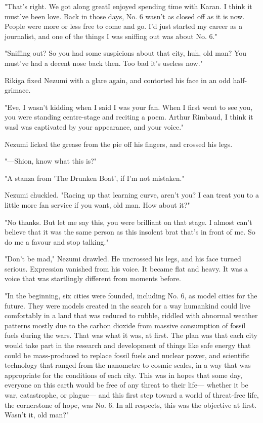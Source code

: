"That's right. We got along great\el I enjoyed spending time with Karan.
I think it must've been love. Back in those days, No. 6 wasn't as closed
off as it is now. People were more or less free to come and go. I'd just
started my career as a journalist, and one of the things I was sniffing
out was about No. 6."

"Sniffing out? So you had some suspicions about that city, huh, old man?
You must've had a decent nose back then. Too bad it's useless now."

Rikiga fixed Nezumi with a glare again, and contorted his face in an odd
half-grimace.

"Eve, I wasn't kidding when I said I was your fan. When I first went to
see you, you were standing centre-stage and reciting a poem. Arthur
Rimbaud, I think it was\el I was captivated by your appearance, and your
voice."

Nezumi licked the grease from the pie off his fingers, and crossed his
legs.


"---Shion, know what this is?"

"A stanza from 'The Drunken Boat', if I'm not mistaken."

Nezumi chuckled. "Racing up that learning curve, aren't you? I can treat
you to a little more fan service if you want, old man. How about it?"

"No thanks. But let me say this, you were brilliant on that stage. I
almost can't believe that it was the same person as this insolent brat
that's in front of me. So do me a favour and stop talking."

"Don't be mad," Nezumi drawled. He uncrossed his legs, and his face
turned serious. Expression vanished from his voice. It became flat and
heavy. It was a voice that was startlingly different from moments
before.

"In the beginning, six cities were founded, including No. 6, as model
cities for the future. They were models created in the search for a way
humankind could live comfortably in a land that was reduced to rubble,
riddled with abnormal weather patterns mostly due to the carbon dioxide
from massive consumption of fossil fuels during the wars. That was what
it was, at first. The plan was that each city would take part in the
research and development of things like safe energy that could be
mass-produced to replace fossil fuels and nuclear power, and scientific
technology that ranged from the nanometre to cosmic scales, in a way
that was appropriate for the conditions of each city. This was in hopes
that some day, everyone on this earth would be free of any threat to
their life--- whether it be war, catastrophe, or plague--- and this first
step toward a world of threat-free life, the cornerstone of hope, was
No. 6. In all respects, this was the objective at first. Wasn't it, old
man?"

